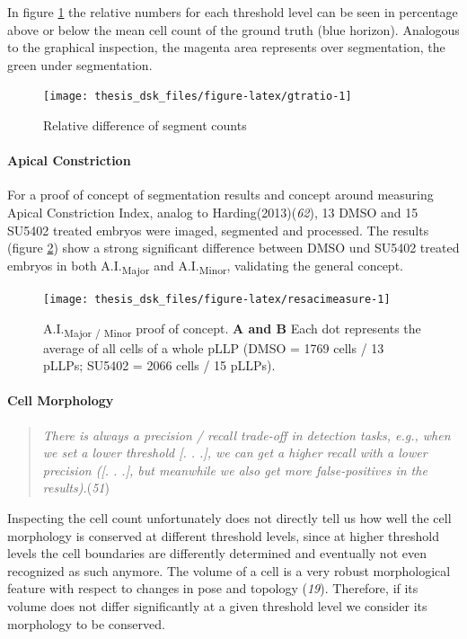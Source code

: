 \documentclass[10pt, b5paper, singlespacinge, twoside]{reedthesis} %
\theoremstyle{definition}
\theoremstyle{definition}
\theoremstyle{definition}
\theoremstyle{remark}
\begin{document}
In figure \ref{fig:gtratio} the relative numbers for each threshold level can be seen in percentage above or below the mean cell count of the ground truth (blue horizon). Analogous to the graphical inspection, the magenta area represents over segmentation, the green under segmentation.


\begin{figure}[H]

{\centering \texttt{[image: thesis\_dsk\_files/figure-latex/gtratio-1]} 

}

\caption[Relative difference of segment counts]{Relative difference of segment counts}\label{fig:gtratio}
\end{figure}
\hypertarget{mat-anallzr3d-ac}{%
\paragraph{Apical Constriction}\label{mat-anallzr3d-ac}}

For a proof of concept of segmentation results and concept around measuring Apical Constriction Index, analog to Harding(2013)(\emph{62}), 13 DMSO and 15 SU5402 treated embryos were imaged, segmented and processed. The results (figure \ref{fig:resacimeasure}) show a strong significant difference between DMSO und SU5402 treated embryos in both A.I.\textsubscript{Major} and A.I.\textsubscript{Minor}, validating the general concept.


\begin{figure}

{\centering \texttt{[image: thesis\_dsk\_files/figure-latex/resacimeasure-1]} 

}

\caption[A.I. Major / Minor proof of concept]{A.I.\textsubscript{Major / Minor} proof of concept. \textbf{A and B} Each dot represents the average of all cells of a whole pLLP (DMSO = 1769 cells / 13 pLLPs; SU5402 = 2066 cells / 15 pLLPs).}\label{fig:resacimeasure}
\end{figure}
\hypertarget{cell-morphology}{%
\paragraph{Cell Morphology}\label{cell-morphology}}
\begin{quote}
\emph{There is always a precision / recall trade-off in detection tasks, e.g., when we set a lower threshold {[}. . .{]}, we can get a higher recall with a lower precision ({[}. . .{]}, but meanwhile we also get more false-positives in the results).}(\emph{51})
\end{quote}
Inspecting the cell count unfortunately does not directly tell us how well the cell morphology is conserved at different threshold levels, since at higher threshold levels the cell boundaries are differently determined and eventually not even recognized as such anymore. The volume of a cell is a very robust morphological feature with respect to changes in pose and topology (\emph{19}). Therefore, if its volume does not differ significantly at a given threshold level we consider its morphology to be conserved.
\end{document}
